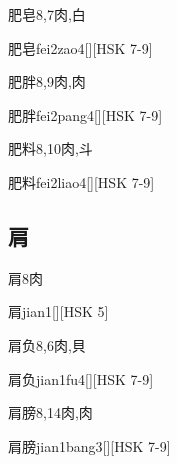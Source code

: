 \begin{Entry}{肥皂}{8,7}{⾁,⽩}
  \begin{Phonetics}{肥皂}{fei2zao4}[][HSK 7-9]
  \end{Phonetics}
\end{Entry}

\begin{Entry}{肥胖}{8,9}{⾁,⾁}
  \begin{Phonetics}{肥胖}{fei2pang4}[][HSK 7-9]
  \end{Phonetics}
\end{Entry}

\begin{Entry}{肥料}{8,10}{⾁,⽃}
  \begin{Phonetics}{肥料}{fei2liao4}[][HSK 7-9]
  \end{Phonetics}
\end{Entry}

\subsection*{肩}

\begin{Entry}{肩}{8}{⾁}
  \begin{Phonetics}{肩}{jian1}[][HSK 5]
  \end{Phonetics}
\end{Entry}

\begin{Entry}{肩负}{8,6}{⾁,⾙}
  \begin{Phonetics}{肩负}{jian1fu4}[][HSK 7-9]
  \end{Phonetics}
\end{Entry}

\begin{Entry}{肩膀}{8,14}{⾁,⾁}
  \begin{Phonetics}{肩膀}{jian1bang3}[][HSK 7-9]
  \end{Phonetics}
\end{Entry}

